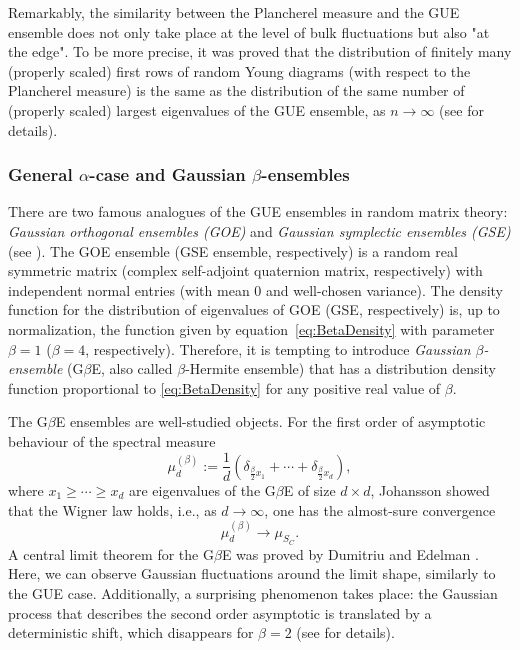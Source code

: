 \documentclass[11pt]{amsart}
\theoremstyle{plain}
\theoremstyle{remark}
\begin{document}
Remarkably, the similarity between the Plancherel measure and the GUE ensemble
does not only take place at the level of bulk fluctuations but also "at the edge".
To be more precise, it was proved that 
the distribution of finitely many (properly scaled) first rows of 
random Young diagrams (with respect to the Plancherel measure)
is the same as the distribution of the same number of (properly scaled) largest eigenvalues of the GUE ensemble,
as $n \to \infty$ (see \cite{BaikDeiftJohansson1999, Okounkov2000, BorodinOkounkovOlshanski2000, Johansson2001a, Johansson2001, BaikDeiftRains2001} for details).

\subsubsection{General $\alpha$-case and Gaussian $\beta$-ensembles}

There are two famous analogues of the GUE ensembles in random matrix theory: 
\emph{Gaussian orthogonal ensembles (GOE)} and \emph{Gaussian symplectic ensembles (GSE)} (see \cite{Mehta2004}).
The GOE ensemble (GSE ensemble, respectively) is a random real symmetric matrix 
(complex self-adjoint quaternion matrix, respectively) with independent normal entries
(with mean $0$ and well-chosen variance).
The density function for the distribution of eigenvalues of GOE (GSE, respectively) is, up to normalization, the function given by equation~\eqref{eq:BetaDensity} with parameter $\beta = 1$ ($\beta = 4$, respectively).
Therefore, it is tempting to introduce
\emph{Gaussian $\beta$-ensemble} (G$\beta$E, also called $\beta$-Hermite ensemble)
that  has a distribution density function proportional to \eqref{eq:BetaDensity} for any positive real value of $\beta$.

The G$\beta$E ensembles are well-studied objects.
For the first order of asymptotic behaviour of the spectral measure
\[ \mu^{(\beta)}_d := \frac{1}{d}\left(\delta_{\frac{\beta}{2}x_1} + \cdots + \delta_{\frac{\beta}{2}x_d}\right),\]
where $x_1 \geq \cdots \geq x_d$ are eigenvalues of the G$\beta$E of size $d\times d$, Johansson \cite{Johansson1998} showed that the Wigner law holds, i.e., as $d\to \infty$,
one has the almost-sure convergence
\begin{equation}\label{eq:first-order-GBE}
    \mu^{(\beta)}_d \to \mu_{S_C}.
\end{equation}
A central limit theorem for the G$\beta$E was proved by Dumitriu and Edelman \cite{DumitriuEdelman2006}.
Here, we can observe Gaussian fluctuations around the limit shape, similarly to the GUE case.
Additionally, a surprising phenomenon takes place:
the Gaussian process that describes the second order asymptotic is translated by a deterministic shift,
which disappears for $\beta = 2$ (see \cite{DumitriuEdelman2006} for details).
\end{document}
